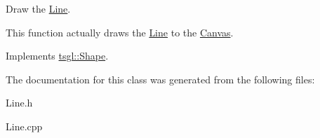 Draw the \hyperlink{classtsgl_1_1_line}{Line}. 

This function actually draws the \hyperlink{classtsgl_1_1_line}{Line} to the \hyperlink{classtsgl_1_1_canvas}{Canvas}. 

Implements \hyperlink{classtsgl_1_1_shape_af78b1627b97d621824ce86db214e2402}{tsgl\-::\-Shape}.



The documentation for this class was generated from the following files\-:\begin{DoxyCompactItemize}
\item 
Line.\-h\item 
Line.\-cpp\end{DoxyCompactItemize}
